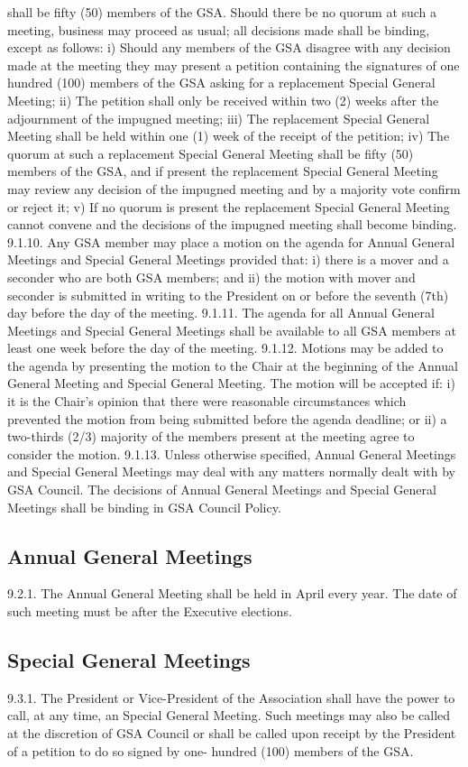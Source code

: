 \documentclass{article}
\begin{document}
shall be fifty (50) members of the GSA. Should there be no quorum at 
such a meeting, business may proceed as usual; all decisions made shall be binding, except as follows: 
i) Should any members of the GSA disagree with any decision made at 
the meeting they may present a petition containing the signatures of 
one hundred (100) members of the GSA asking for a replacement 
Special General Meeting; 
ii) The petition shall only be received within two (2) weeks after the 
adjournment of the impugned meeting; 
iii) The replacement Special General Meeting shall be held within one (1) 
week of the receipt of the petition; 
iv) The quorum at such a replacement Special General Meeting shall be 
fifty (50) members of the GSA, and if present the replacement Special 
General Meeting may review any decision of the impugned meeting 
and by a majority vote confirm or reject it; 
v) If no quorum is present the replacement Special General Meeting 
cannot convene and the decisions of the impugned meeting shall 
become binding. 
9.1.10. Any GSA member may place a motion on the agenda for Annual 
General Meetings and Special General Meetings provided that: 
i) there is a mover and a seconder who are both GSA members; and 
ii) the motion with mover and seconder is submitted in writing to the 
President on or before the seventh (7th) day before the day of the 
meeting. 
9.1.11. The agenda for all Annual General Meetings and Special General 
Meetings shall be available to all GSA members at least one week 
before the day of the meeting. 
9.1.12. Motions may be added to the agenda by presenting the motion to 
the Chair at the beginning of the Annual General Meeting and Special 
General Meeting. The motion will be accepted if: 
i) it is the Chair's opinion that there were reasonable circumstances 
which prevented the motion from being submitted before the agenda 
deadline; or 
ii) a two-thirds (2/3) majority of the members present at the meeting 
agree to consider the motion. 
9.1.13. Unless otherwise specified, Annual General Meetings and Special 
General Meetings may deal with any matters normally dealt with by 
GSA Council. The decisions of Annual General Meetings and Special 
General Meetings shall be binding in GSA Council Policy. 
\subsection{Annual General Meetings }
9.2.1. The Annual General Meeting shall be held in April every year. The 
date of such meeting must be after the Executive elections. 
\subsection{Special General Meetings }
9.3.1. The President or Vice-President of the Association shall have the 
power to call, at any time, an Special General Meeting. Such meetings 
may also be called at the discretion of GSA Council or shall be called 
upon receipt by the President of a petition to do so signed by one- 
hundred (100) members of the GSA. 
\end{document}
